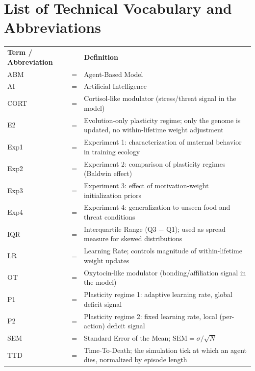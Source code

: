 \chapter*{List of Technical Vocabulary and Abbreviations}

\setlength{\tabcolsep}{4pt}
\renewcommand{\arraystretch}{1.05}
\footnotesize
\begin{tabularx}{\linewidth}{>{\raggedright\arraybackslash}p{3.6cm} >{\centering\arraybackslash}p{0.6cm} >{\raggedright\arraybackslash}X}
\textbf{Term / Abbreviation} & & \textbf{Definition} \\[0.5cm]

ABM      & = & Agent-Based Model \\
AI       & = & Artificial Intelligence \\
CORT     & = & Cortisol-like modulator (stress/threat signal in the model) \\
E2       & = & Evolution-only plasticity regime; only the genome is updated, no within-lifetime weight adjustment \\
Exp1     & = & Experiment 1: characterization of maternal behavior in training ecology \\
Exp2     & = & Experiment 2: comparison of plasticity regimes (Baldwin effect) \\
Exp3     & = & Experiment 3: effect of motivation-weight initialization priors \\
Exp4     & = & Experiment 4: generalization to unseen food and threat conditions \\
IQR      & = & Interquartile Range (Q3 $-$ Q1); used as spread measure for skewed distributions \\
LR       & = & Learning Rate; controls magnitude of within-lifetime weight updates \\
OT       & = & Oxytocin-like modulator (bonding/affiliation signal in the model) \\
P1       & = & Plasticity regime 1: adaptive learning rate, global deficit signal \\
P2       & = & Plasticity regime 2: fixed learning rate, local (per-action) deficit signal \\
SEM      & = & Standard Error of the Mean; $\text{SEM} = \sigma / \sqrt{N}$ \\
TTD      & = & Time-To-Death; the simulation tick at which an agent dies, normalized by episode length \\


\end{tabularx}
